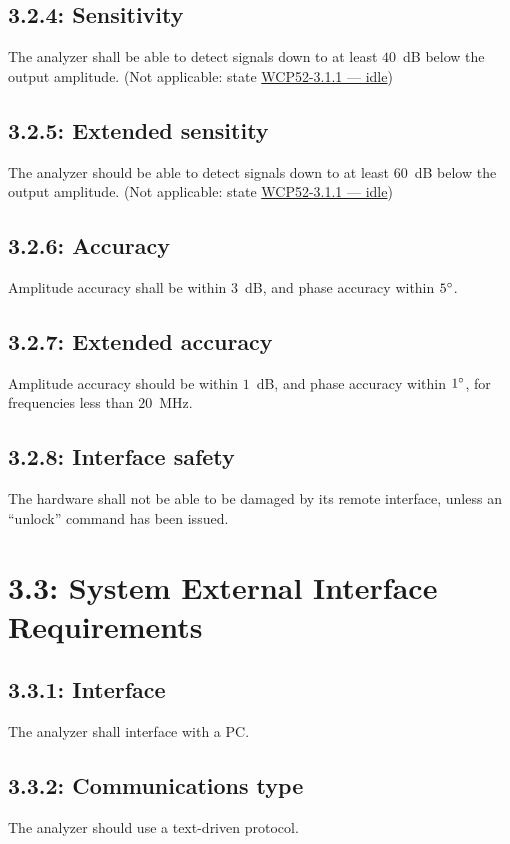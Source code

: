 \subsection*{3.2.4: Sensitivity}
\label{prs:3.2.4}
The analyzer shall be able to detect signals down to at least $40$~dB below the output
amplitude. (Not applicable: state \hyperref[prs:3.1.1]{WCP52-3.1.1 --- idle})

\subsection*{3.2.5: Extended sensitity}
\label{prs:3.2.5}
The analyzer should be able to detect signals down to at least $60$~dB below the output
amplitude. (Not applicable: state \hyperref[prs:3.1.1]{WCP52-3.1.1 --- idle})

\subsection*{3.2.6: Accuracy}
\label{prs:3.2.6}
Amplitude accuracy shall be within $3$~dB, and phase accuracy within $5{}^\circ$.

\subsection*{3.2.7: Extended accuracy}
\label{prs:3.2.7}
Amplitude accuracy should be within $1$~dB, and phase accuracy within $1{}^\circ$, for
frequencies less than $20$~MHz.

\subsection*{3.2.8: Interface safety}
\label{prs:3.2.8}
The hardware shall not be able to be damaged by its remote interface, unless an ``unlock'' command
has been issued.

\section*{3.3: System External Interface Requirements}

\subsection*{3.3.1: Interface}
\label{prs:3.3.1}
The analyzer shall interface with a PC.

\subsection*{3.3.2: Communications type}
\label{prs:3.3.2}
The analyzer should use a text-driven protocol.

